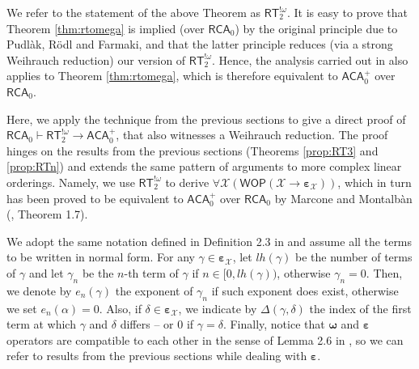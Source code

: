 \documentclass{amsart}
\newcommand\Nat{\mathbb{N}}
\newcommand\RCA{\mathsf{RCA}}
\newcommand\ACA{\mathsf{ACA}}
\newcommand\RT{\mathsf{RT}}
\newcommand\WOP{\mathsf{WOP}}
\newcommand{\LoX}{\mathcal{X}}
\newcommand\boldomega{\pmb{\omega}}
\newcommand\boldepsilon{\pmb{\varepsilon}}
\begin{document}
We refer to the statement of the above Theorem as $\RT^{!\omega}_2$. It is easy to prove that Theorem \ref{thm:rtomega} is implied (over $\RCA_0$) by the original principle due to Pudl\`ak, R\"odl and Farmaki, and that the latter principle reduces (via a strong Weihrauch reduction) our version of $\RT^{!\omega}_2$. Hence, the analysis carried out in \cite{Car-Zda:RT} also applies to Theorem \ref{thm:rtomega}, which is therefore equivalent to $\ACA_0^+$ over $\RCA_0$. 

Here, we apply the technique from the previous sections to 
give a direct proof of $\RCA_0 \vdash \RT^{!\omega}_2 \to \ACA_0^+$, that also witnesses a Weihrauch reduction. 
The proof hinges on the results from the previous sections (Theorems \ref{prop:RT3} and 
\ref{prop:RTn}) and extends the same pattern of arguments to more complex linear orderings. 
Namely, we use $\RT^{!\omega}_2$ to derive $\forall \LoX (\WOP(\LoX\to \boldepsilon_\LoX))$, which in turn has been proved to be equivalent to $\ACA_0^+$ over $\RCA_0$ by Marcone and Montalb\`an (\cite{Mar-Mon:11}, Theorem 1.7).

We adopt the same notation defined in Definition 2.3 in \cite{Mar-Mon:11} and assume all the terms to be written in normal form. For any $\gamma \in \boldepsilon_\LoX$, let $lh(\gamma)$ be the number of terms of $\gamma$ and let $\gamma_n$ be the $n$-th term of $\gamma$ if $n \in [0,lh(\gamma))$, otherwise $\gamma_n = 0$. Then, we denote by $e_n(\gamma)$ the exponent of $\gamma_n$ if such exponent does exist, otherwise we set $e_n(\alpha) = 0$. Also, if $\delta \in \boldepsilon_\LoX$, we indicate by $\Delta(\gamma,\delta)$ the index of the first term at which $\gamma$ and $\delta$ differs -- or 0 if $\gamma = \delta$.
Finally, notice that $\boldomega$ and $\boldepsilon$ operators are compatible to each other in the sense of Lemma 2.6 in \cite{Mar-Mon:11}, so we can refer to results from the previous sections while dealing with $\boldepsilon$.
\end{document}
